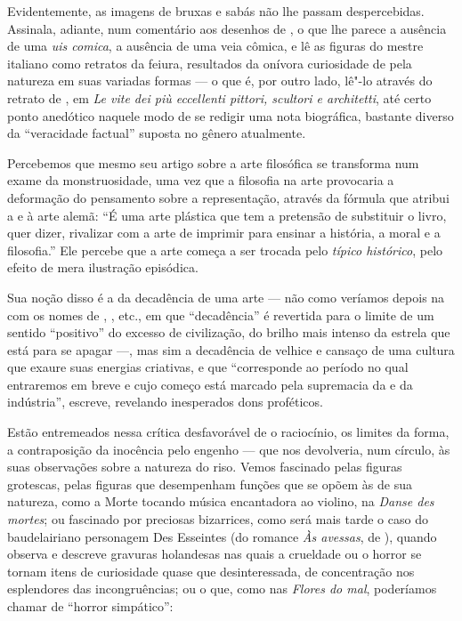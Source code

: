 Evidentemente, as imagens de bruxas e sabás não lhe passam
despercebidas. Assinala, adiante, num comentário aos desenhos de , o que lhe parece a ausência de uma \textit{uis comica}, a
ausência de uma veia cômica, e lê as figuras do mestre italiano como
retratos da feiura, resultados da onívora curiosidade de  pela
natureza em suas variadas formas --- o que é, por outro lado, lê"-lo
através do retrato de , em \textit{Le vite dei più eccellenti
pittori, scultori e architetti}, até certo ponto anedótico naquele modo
de se redigir uma nota biográfica, bastante diverso da “veracidade
factual” suposta no gênero atualmente.

Percebemos que mesmo seu artigo sobre a arte filosófica se transforma
num exame da monstruosidade, uma vez que a filosofia na arte provocaria
a deformação do pensamento sobre a representação, através da fórmula
que atribui a  e à arte alemã: “É uma arte plástica que tem a
pretensão de substituir o livro, quer dizer, rivalizar com a arte de
imprimir para ensinar a história, a moral e a filosofia.” Ele percebe
que a arte começa a ser trocada pelo \textit{típico histórico}, pelo
efeito de mera ilustração episódica. 

Sua noção disso é a da decadência de uma arte --- não como
veríamos depois na  com os nomes de , , 
etc., em que “decadência” é revertida para o limite de um sentido
“positivo” do excesso de civilização, do brilho mais intenso da estrela
que está para se apagar ---, mas sim a decadência de velhice e cansaço
de uma cultura que exaure suas energias criativas, e que “corresponde
ao período no qual entraremos em breve e cujo começo está marcado pela
supremacia da  e da indústria”, escreve, revelando inesperados
dons proféticos.

Estão entremeados nessa crítica desfavorável de  o
raciocínio, os limites da forma, a contraposição da inocência pelo
engenho --- que nos devolveria, num círculo, às suas observações sobre
a natureza do riso. Vemos  fascinado pelas figuras grotescas,
pelas figuras que desempenham funções que se opõem às de sua natureza,
como a Morte tocando música encantadora ao violino, na \textit{Danse
des mortes}; ou fascinado por preciosas bizarrices, como será mais
tarde o caso do baudelairiano personagem Des Esseintes (do romance
\textit{Às avessas}, de ), quando observa e descreve
gravuras holandesas nas quais a crueldade ou o horror se tornam itens
de curiosidade quase que desinteressada, de concentração nos
esplendores das incongruências; ou o que, como nas \textit{Flores do mal}, 
poderíamos chamar de “horror simpático”:

